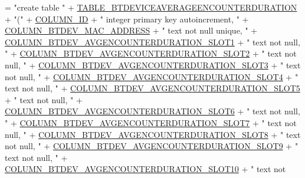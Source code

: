 \begin{DoxyCode}
= \textcolor{stringliteral}{"create table "}
            + \hyperlink{classcs_1_1nsense_1_1db_1_1_n_sense_s_q_lite_helper_a9058c3ab1e8af8ebb117a913e32a5a07}{TABLE\_BTDEVICEAVERAGEENCOUNTERDURATION} + \textcolor{stringliteral}{"("}
            + \hyperlink{classcs_1_1nsense_1_1db_1_1_n_sense_s_q_lite_helper_a42c92e67b4392524cb4f6bf4c4da4c79}{COLUMN\_ID} + \textcolor{stringliteral}{" integer primary key autoincrement, "}
            + \hyperlink{classcs_1_1nsense_1_1db_1_1_n_sense_s_q_lite_helper_a66d760b81948efc86eafb0bb5147c2a5}{COLUMN\_BTDEV\_MAC\_ADDRESS} + \textcolor{stringliteral}{" text not null unique, "}
            + \hyperlink{classcs_1_1nsense_1_1db_1_1_n_sense_s_q_lite_helper_a01abb8709f16bb28bf7779efee94ac3a}{COLUMN\_BTDEV\_AVGENCOUNTERDURATION\_SLOT1} + \textcolor{stringliteral}{" text not
       null, "}
            + \hyperlink{classcs_1_1nsense_1_1db_1_1_n_sense_s_q_lite_helper_a14a25d28cd5b4e703d0cd168fa139afe}{COLUMN\_BTDEV\_AVGENCOUNTERDURATION\_SLOT2} + \textcolor{stringliteral}{" text not
       null, "}
            + \hyperlink{classcs_1_1nsense_1_1db_1_1_n_sense_s_q_lite_helper_a56b3605c7035238a393c85fcd728b6f4}{COLUMN\_BTDEV\_AVGENCOUNTERDURATION\_SLOT3} + \textcolor{stringliteral}{" text not
       null, "}
            + \hyperlink{classcs_1_1nsense_1_1db_1_1_n_sense_s_q_lite_helper_a32daef921c1403dad6e392b7e6175807}{COLUMN\_BTDEV\_AVGENCOUNTERDURATION\_SLOT4} + \textcolor{stringliteral}{" text not
       null, "}
            + \hyperlink{classcs_1_1nsense_1_1db_1_1_n_sense_s_q_lite_helper_a1c7b3ac072abf5067e215710ff923d3a}{COLUMN\_BTDEV\_AVGENCOUNTERDURATION\_SLOT5} + \textcolor{stringliteral}{" text not
       null, "}
            + \hyperlink{classcs_1_1nsense_1_1db_1_1_n_sense_s_q_lite_helper_af08de2fe7b75c324ff9b5d3c713ba4d9}{COLUMN\_BTDEV\_AVGENCOUNTERDURATION\_SLOT6} + \textcolor{stringliteral}{" text not
       null, "}
            + \hyperlink{classcs_1_1nsense_1_1db_1_1_n_sense_s_q_lite_helper_a888f87fe7e2d20149ea4a75c83665e13}{COLUMN\_BTDEV\_AVGENCOUNTERDURATION\_SLOT7} + \textcolor{stringliteral}{" text not
       null, "}
            + \hyperlink{classcs_1_1nsense_1_1db_1_1_n_sense_s_q_lite_helper_acddc3fed55cd2104452b8ced0bc2e616}{COLUMN\_BTDEV\_AVGENCOUNTERDURATION\_SLOT8} + \textcolor{stringliteral}{" text not
       null, "}
            + \hyperlink{classcs_1_1nsense_1_1db_1_1_n_sense_s_q_lite_helper_a6db3acd70272fce4a431e6f529acbf7f}{COLUMN\_BTDEV\_AVGENCOUNTERDURATION\_SLOT9} + \textcolor{stringliteral}{" text not
       null, "}
            + \hyperlink{classcs_1_1nsense_1_1db_1_1_n_sense_s_q_lite_helper_a95a081220d68d8e653f3b185c85e2590}{COLUMN\_BTDEV\_AVGENCOUNTERDURATION\_SLOT10} + \textcolor{stringliteral}{" text not
}
\end{DoxyCode}
